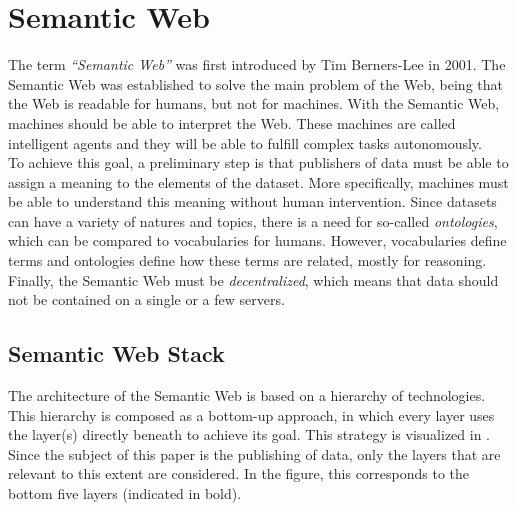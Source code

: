 \section{Semantic Web}
The term \emph{``Semantic Web''} was first introduced by Tim Berners-Lee in 2001\cite{berners2001semantic}. The Semantic Web was established to solve the main problem of the Web, being that the Web is readable for humans, but not for machines. With the Semantic Web, machines should be able to interpret the Web. These machines are called intelligent agents and they will be able to fulfill complex tasks autonomously.\\

\noindent To achieve this goal, a preliminary step is that publishers of data must be able to assign a meaning to the elements of the dataset. More specifically, machines must be able to understand this meaning without human intervention. Since datasets can have a variety of natures and topics, there is a need for so-called \emph{ontologies}, which can be compared to vocabularies for humans. However, vocabularies define terms and ontologies define how these terms are related, mostly for reasoning. Finally, the Semantic Web must be \emph{decentralized}, which means that data should not be contained on a single or a few servers\cite{berners2001semantic}.

\subsection{Semantic Web Stack}
The architecture of the Semantic Web is based on a hierarchy of technologies. This hierarchy is composed as a bottom-up approach, in which every layer uses the layer(s) directly beneath to achieve its goal. This strategy is visualized in . Since the subject of this paper is the publishing of data, only the layers that are relevant to this extent are considered. In the figure, this corresponds to the bottom five layers (indicated in bold).

